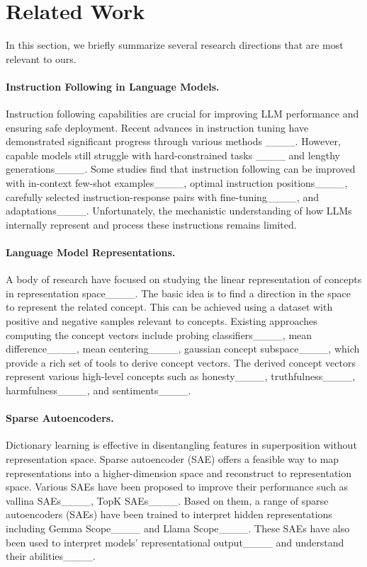 \section{Related Work}
In this section, we briefly summarize several research directions that are most relevant to ours.

\paragraph{Instruction Following in Language Models.}
Instruction following capabilities are crucial for improving LLM performance and ensuring safe deployment. Recent advances in instruction tuning have demonstrated significant progress through various methods ____. However, capable models still struggle with hard-constrained tasks ____ and lengthy generations____. Some studies find that instruction following can be improved with in-context few-shot examples____, optimal instruction positions____, carefully selected instruction-response pairs with fine-tuning____, and adaptations____. Unfortunately, the mechanistic understanding of how LLMs internally represent and process these instructions remains limited. 

\paragraph{Language Model Representations.}
A body of research have focused on studying the linear representation of concepts in representation space____. The basic idea is to find a direction in the space to represent the related concept. This can be achieved using a dataset with positive and negative samples relevant to concepts. Existing approaches computing the concept vectors include probing classifiers____, mean difference____, mean centering____, gaussian concept subspace____, which provide a rich set of tools to derive concept vectors. The derived concept vectors represent various high-level concepts such as honesty____, truthfulness____, harmfulness____, and sentiments____.

\paragraph{Sparse Autoencoders.} Dictionary learning is effective in disentangling features in superposition without representation space. Sparse autoencoder (SAE) offers a feasible way to map representations into a higher-dimension space and reconstruct to representation space. Various SAEs have been proposed to improve their performance such as vallina SAEs____, TopK SAEs____. Based on them, a range of sparse autoencoders (SAEs) have been trained to interpret hidden representations including Gemma Scope____ and Llama Scope____. These SAEs have also been used to interpret models' representational output____ and understand their abilities____.

